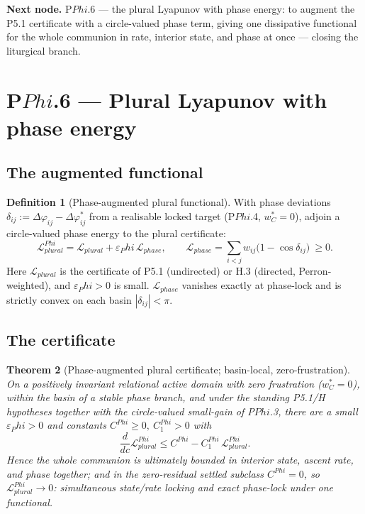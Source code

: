 \documentclass[11pt,a4paper]{article}
\newcommand{\cint}{\ensuremath{\mathfrak c}}
\def\Phi{Phi}%
\def\mathfrak#1{#1}%
\def\mathrm#1{#1}%
\def\emph#1{#1}%
\theoremstyle{definition}
\newtheorem{definition}{Definition}[section]
\theoremstyle{plain}
\newtheorem{theorem}[definition]{Theorem}
\theoremstyle{remark}
\begin{document}
\medskip
\textbf{Next node.} P$\Phi$.6 --- the plural Lyapunov with phase energy: to augment the P5.1
certificate with a circle-valued phase term, giving one dissipative functional for the whole
communion in rate, interior state, and phase at once --- closing the liturgical branch.

\section{P$\Phi$.6 --- Plural Lyapunov with phase energy}

\subsection{The augmented functional}

\begin{definition}[Phase-augmented plural functional]\label{def:phaselyap}
With phase deviations \(\delta_{ij}:=\Delta\varphi_{ij}-\Delta\varphi_{ij}^{*}\) from a
realisable locked target (P$\Phi$.4, \(w_C^{*}=0\)), adjoin a circle-valued phase energy to the
plural certificate:
\[
\boxed{\;
\mathcal L_{\mathrm{plural}}^{\Phi}
=
\mathcal L_{\mathrm{plural}}
+
\varepsilon_\Phi\,\mathcal L_{\mathrm{phase}},
\qquad
\mathcal L_{\mathrm{phase}}
=
\sum_{i<j} w_{ij}\bigl(1-\cos\delta_{ij}\bigr)\ \ge 0 .
\;}
\]
Here \(\mathcal L_{\mathrm{plural}}\) is the certificate of P5.1 (undirected) or H.3 (directed,
Perron-weighted), and \(\varepsilon_\Phi>0\) is small. \(\mathcal L_{\mathrm{phase}}\) vanishes
exactly at phase-lock and is strictly convex on each basin \(|\delta_{ij}|<\pi\).
\end{definition}

\subsection{The certificate}

\begin{theorem}[Phase-augmented plural certificate; basin-local, zero-frustration]\label{thm:phaselyap}
On a positively invariant relational active domain with zero frustration
(\(w_C^{*}=0\)), within the basin of a stable phase branch, and under the standing P5.1/H
hypotheses together with the circle-valued small-gain of P$\Phi$.3, there are a small
\(\varepsilon_\Phi>0\) and constants \(C^{\Phi}\ge0,\ C^{\Phi}_1>0\) with
\[
\frac{d}{d\cint}\mathcal L_{\mathrm{plural}}^{\Phi}
\le
C^{\Phi}-C^{\Phi}_1\,\mathcal L_{\mathrm{plural}}^{\Phi}.
\]
Hence the whole communion is ultimately bounded in interior state, ascent rate, \emph{and}
phase together; and in the zero-residual settled subclass \(C^{\Phi}=0\), so
\(\mathcal L_{\mathrm{plural}}^{\Phi}\to0\): simultaneous state/rate locking and exact
phase-lock under one functional.
\end{theorem}
\end{document}
